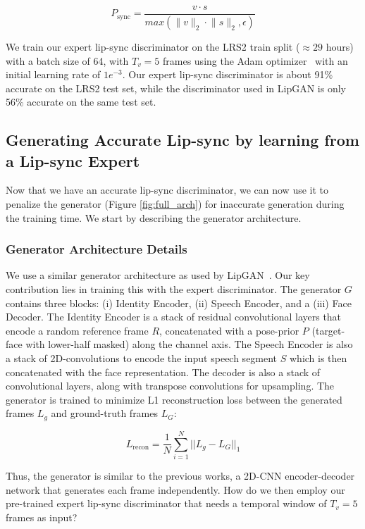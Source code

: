 \documentclass[sigconf]{acmart}
\begin{document}
\begin{equation}
    P_{\mathrm{sync}} = \dfrac{v \cdot s}{max(\lVert v \rVert_{2} \cdot \lVert s \rVert_{2}, \epsilon)}
\label{eq:cosine}
\end{equation}

We train our expert lip-sync discriminator on the LRS2 train split ($\approx29$ hours) with a batch size of 64, with $T_v = 5$ frames using the Adam optimizer~\cite{duchi2011adaptive} with an initial learning rate of $1e^{-3}$. Our expert lip-sync discriminator is about 91\% accurate on the LRS2 test set, while the discriminator used in LipGAN is only 56\% accurate on the same test set. 

\subsection{Generating Accurate Lip-sync by learning from a Lip-sync Expert}
Now that we have an accurate lip-sync discriminator, we can now use it to penalize the generator (Figure \ref{fig:full_arch}) for inaccurate generation during the training time. We start by describing the generator architecture. 

\subsubsection{Generator Architecture Details} We use a similar generator architecture as used by LipGAN~\cite{kr2019towards}. Our key contribution lies in training this with the expert discriminator. The generator $G$ contains three blocks: (i) Identity Encoder, (ii) Speech Encoder, and a (iii) Face Decoder. The Identity Encoder is a stack of residual convolutional layers that encode a random reference frame $R$, concatenated with a pose-prior $P$ (target-face with lower-half masked) along the channel axis. The Speech Encoder is also a stack of 2D-convolutions to encode the input speech segment $S$ which is then concatenated with the face representation. The decoder is also a stack of convolutional layers, along with transpose convolutions for upsampling. The generator is trained to minimize L1 reconstruction loss between the generated frames $L_g$ and ground-truth frames $L_G$:

\begin{equation}
L_{\mathrm{recon}} = \frac{1}{N} \sum^{N}_{i=1} ||L_g - L_G||_1
\label{eqn:recon}
\end{equation}

Thus, the generator is similar to the previous works, a 2D-CNN encoder-decoder network that generates each frame independently. How do we then employ our pre-trained expert lip-sync discriminator that needs a temporal window of $T_v=5$ frames as input?
\end{document}
